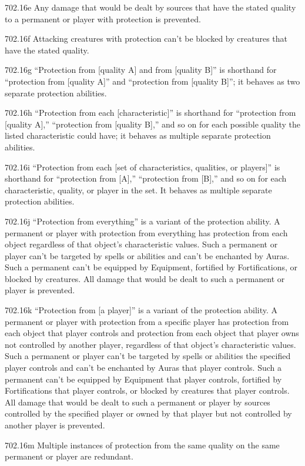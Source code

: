 702.16e Any damage that would be dealt by sources that have the stated quality to a permanent or player with protection is prevented.

702.16f Attacking creatures with protection can’t be blocked by creatures that have the stated quality.

702.16g “Protection from [quality A] and from [quality B]” is shorthand for “protection from [quality A]” and “protection from [quality B]”; it behaves as two separate protection abilities.

702.16h “Protection from each [characteristic]” is shorthand for “protection from [quality A],” “protection from [quality B],” and so on for each possible quality the listed characteristic could have; it behaves as multiple separate protection abilities.

702.16i “Protection from each [set of characteristics, qualities, or players]” is shorthand for “protection from [A],” “protection from [B],” and so on for each characteristic, quality, or player in the set. It behaves as multiple separate protection abilities.

702.16j “Protection from everything” is a variant of the protection ability. A permanent or player with protection from everything has protection from each object regardless of that object’s characteristic values. Such a permanent or player can’t be targeted by spells or abilities and can’t be enchanted by Auras. Such a permanent can’t be equipped by Equipment, fortified by Fortifications, or blocked by creatures. All damage that would be dealt to such a permanent or player is prevented.

702.16k “Protection from [a player]” is a variant of the protection ability. A permanent or player with protection from a specific player has protection from each object that player controls and protection from each object that player owns not controlled by another player, regardless of that object’s characteristic values. Such a permanent or player can’t be targeted by spells or abilities the specified player controls and can’t be enchanted by Auras that player controls. Such a permanent can’t be equipped by Equipment that player controls, fortified by Fortifications that player controls, or blocked by creatures that player controls. All damage that would be dealt to such a permanent or player by sources controlled by the specified player or owned by that player but not controlled by another player is prevented.

702.16m Multiple instances of protection from the same quality on the same permanent or player are redundant.

